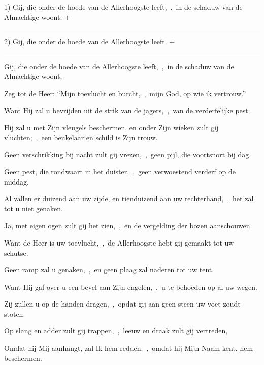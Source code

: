 \documentclass[12pt,twoside,a5paper]{article}
\begin{document}
\begin{halfparskip}
   1)   Gij, die onder de hoede van de Allerhoogste leeft,~\sep\ in de schaduw van de Almachtige woont. + 

  \noindent\rule{\textwidth}{0.5pt}

  2)   Gij, die onder de hoede van de Allerhoogste leeft. + 

  \noindent\rule{\textwidth}{0.5pt}

   Gij, die onder de hoede van de Allerhoogste leeft,~\sep\ in de schaduw van de Almachtige woont.

  Zeg tot de Heer: ``Mijn toevlucht en burcht,~\sep\ mijn God, op wie ik vertrouw.''

  Want Hij zal u bevrijden uit de strik van de jagers,~\sep\ van de verderfelijke pest.

  Hij zal u met Zijn vleugels beschermen, en onder Zijn wieken zult gij vluchten;~\sep\ een beukelaar en schild is Zijn trouw.

  Geen verschrikking bij nacht zult gij vrezen,~\sep\ geen pijl, die voortsnort bij dag.

  Geen pest, die rondwaart in het duister,~\sep\ geen verwoestend verderf op de middag.

  Al vallen er duizend aan uw zijde, en tienduizend aan uw rechterhand,~\sep\ het zal tot u niet genaken.

  Ja, met eigen ogen zult gij het zien,~\sep\ en de vergelding der bozen aanschouwen.

  Want de Heer is uw toevlucht,~\sep\ de Allerhoogste hebt gij gemaakt tot uw schutse.

  Geen ramp zal u genaken,~\sep\ en geen plaag zal naderen tot uw tent.

  Want Hij gaf over u een bevel aan Zijn engelen,~\sep\ u te behoeden op al uw wegen.

  Zij zullen u op de handen dragen,~\sep\ opdat gij aan geen steen uw voet zoudt stoten.

  Op slang en adder zult gij trappen,~\sep\ leeuw en draak zult gij vertreden,

  Omdat hij Mij aanhangt, zal Ik hem redden;~\sep\ omdat hij Mijn Naam kent, hem beschermen.


\end{halfparskip}
\end{document}
